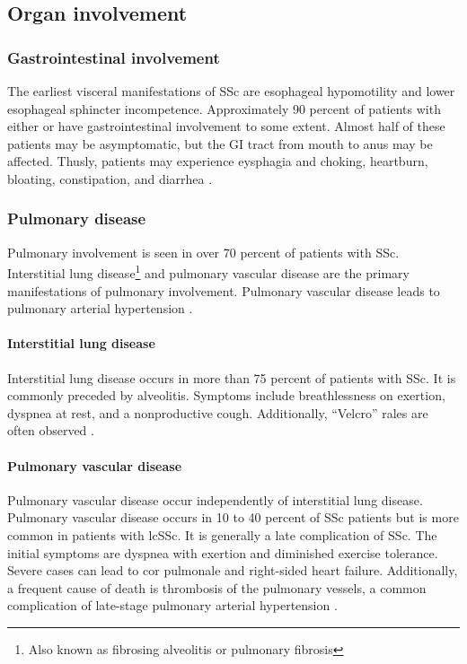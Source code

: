 \subsection{Organ involvement}


\subsubsection{Gastrointestinal involvement}

The earliest visceral manifestations of SSc are esophageal hypomotility and
lower esophageal sphincter incompetence. Approximately 90 percent of patients
with either \dcSSc or \lcSSc have gastrointestinal involvement to some extent.
Almost half of these patients may be asymptomatic, but the GI tract from mouth
to anus may be affected. Thusly, patients may experience eysphagia and
choking, heartburn, bloating, constipation, and diarrhea \citep{overviewSSc}.

\subsubsection{Pulmonary disease}

Pulmonary involvement is seen in over 70 percent of patients with SSc.
Interstitial lung disease\footnote{Also known as fibrosing alveolitis or
pulmonary fibrosis} and pulmonary vascular disease are the primary
manifestations of pulmonary involvement. Pulmonary vascular disease leads to
pulmonary arterial hypertension \citep{overviewSSc}.

\paragraph{Interstitial lung disease}

Interstitial lung disease occurs in more than 75 percent of patients with SSc.
It is commonly preceded by alveolitis. Symptoms include breathlessness on
exertion, dyspnea at rest, and a nonproductive cough. Additionally, ``Velcro''
rales are often observed \citep{overviewSSc}.

\paragraph{Pulmonary vascular disease}

Pulmonary vascular disease occur independently of interstitial lung disease.
Pulmonary vascular disease occurs in 10 to 40 percent of SSc patients but is
more common in patients with lcSSc. It is generally a late complication of
SSc. The initial symptoms are dyspnea with exertion and diminished exercise
tolerance. Severe cases can lead to cor pulmonale and right-sided heart
failure. Additionally, a frequent cause of death is thrombosis of the
pulmonary vessels, a common complication of late-stage pulmonary arterial
hypertension \cite{overviewSSc}.

